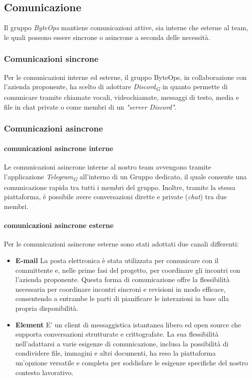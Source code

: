 \documentclass{article}
\begin{document}
\subsection{Comunicazione}
Il gruppo \textit{ByteOps} mantiene comunicazioni attive, sia interne che esterne al team, le quali possono essere sincrone o asincrone a seconda delle necessità.
\subsubsection{Comunicazioni sincrone}
Per le comunicazioni interne ed esterne, il gruppo ByteOps, in collaborazione con l'azienda proponente, ha scelto di adottare \textit{Discord}\textsubscript{\textit{G}} in quanto permette di comunicare tramite chiamate vocali, videochiamate, messaggi di testo, media e file in chat private o come membri di un \textit{"server Discord"}.
\subsubsection{Comunicazioni asincrone}
\paragraph{comunicazioni asincrone interne}
Le comunicazioni asincrone interne al nostro team avvengono tramite l'applicazione \textit{Telegram}\textsubscript{\textit{G}} all'interno di un Gruppo dedicato, il quale consente una comunicazione rapida tra tutti i membri del gruppo. Inoltre, tramite la stessa piattaforma, è possibile avere conversazioni dirette e private (\textit{chat}) tra due membri.
\paragraph{comunicazioni asincrone esterne}
Per le comunicazioni asincrone esterne sono stati adottati due canali differenti:
\begin{itemize}
    \item \textbf{E-mail} La posta elettronica è stata utilizzata per comunicare con il committente e, nelle prime fasi del progetto, per coordinare gli incontri con l'azienda proponente. Questa forma di comunicazione offre la flessibilità necessaria per coordinare incontri sincroni e revisioni in modo efficace, consentendo a entrambe le parti di pianificare le interazioni in base alla propria disponibilità.
    \item \textbf{Element} E' un client di messaggistica istantanea libero ed open source che supporta conversazioni strutturate e crittografate. La sua flessibilità nell'adattarsi a varie esigenze di comunicazione, inclusa la possibilità di condividere file, immagini e altri documenti, ha reso la piattaforma un'opzione versatile e completa per soddisfare le esigenze specifiche del nostro contesto lavorativo.
\end{itemize}
\end{document}
